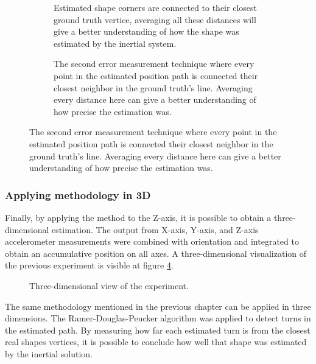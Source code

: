 \begin{figure}[!h]
    \centering
    \begin{subfigure}{0.75\textwidth}
        \centering
        \resizebox{1\linewidth}{!}{}
        \caption{Estimated shape corners are connected to their closest ground truth vertice, averaging all these distances will give a better understanding of how the shape was estimated by the inertial system.}
        \label{fig:square_turn}
    \end{subfigure}

    \begin{subfigure}{0.75\textwidth}
        \centering
        \resizebox{1\linewidth}{!}{}
        \caption{The second error measurement technique where every point in the estimated position path is connected their closest neighbor in the ground truth's line. Averaging every distance here can give a better understanding of how precise the estimation was.}
        \label{fig:square_point}
    \end{subfigure}
    \label{fig:error_methods}
\end{figure}

\newpage

\subsubsection{Applying methodology in 3D}

Finally, by applying the method to the Z-axis, it is possible to obtain a  three-dimensional estimation. The output from X-axis, Y-axis, and Z-axis accelerometer measurements were combined with orientation and integrated to obtain an accumulative position on all axes.
A three-dimensional visualization of the previous experiment is visible at figure \ref{fig:square3D}.

\begin{figure}[!h]
    \centering
    \resizebox{0.8\linewidth}{!}{}
    \caption{Three-dimensional view of the experiment.}
    \label{fig:square3D}
\end{figure}

The same methodology mentioned in the previous chapter can be applied in three dimensions. The Ramer-Douglas-Peucker algorithm was applied to detect turns in the estimated path. By measuring how far each estimated turn is from the closest real shapes vertices, it is possible to conclude how well that shape was estimated by the inertial solution.

